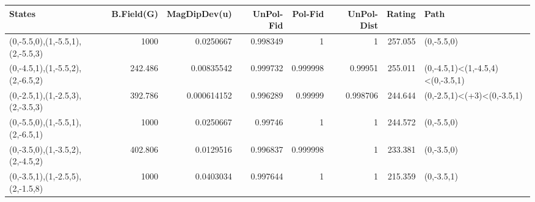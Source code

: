 \begin{tabular}{lrrrrrrl}
\hline
 States                           &   B.Field(G) &   MagDipDev(u) &   UnPol-Fid &   Pol-Fid &   UnPol-Dist &   Rating & Path                             \\
\hline
 (0,-5.5,0),(1,-5.5,1),(2,-5.5,3) &     1000     &    0.0250667   &    0.998349 &  1        &     1        &  257.055 & (0,-5.5,0)                       \\
 (0,-4.5,1),(1,-5.5,2),(2,-6.5,2) &      242.486 &    0.00835542  &    0.999732 &  0.999998 &     0.99951  &  255.011 & (0,-4.5,1)<(1,-4.5,4)<(0,-3.5,1) \\
 (0,-2.5,1),(1,-2.5,3),(2,-3.5,3) &      392.786 &    0.000614152 &    0.996289 &  0.99999  &     0.998706 &  244.644 & (0,-2.5,1)<(+3)<(0,-3.5,1)       \\
 (0,-5.5,0),(1,-5.5,1),(2,-6.5,1) &     1000     &    0.0250667   &    0.99746  &  1        &     1        &  244.572 & (0,-5.5,0)                       \\
 (0,-3.5,0),(1,-3.5,2),(2,-4.5,2) &      402.806 &    0.0129516   &    0.996837 &  0.999998 &     1        &  233.381 & (0,-3.5,0)                       \\
 (0,-3.5,1),(1,-2.5,5),(2,-1.5,8) &     1000     &    0.0403034   &    0.997644 &  1        &     1        &  215.359 & (0,-3.5,1)                       \\
\hline
\end{tabular}